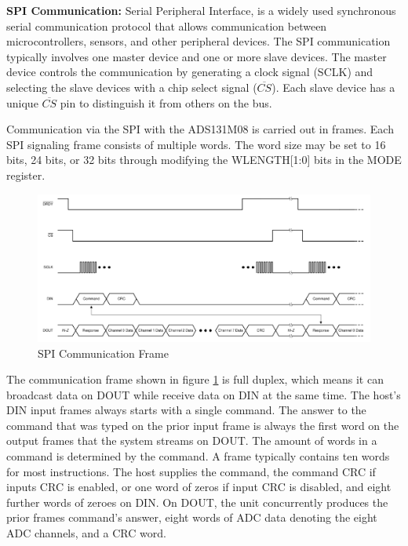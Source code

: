 \textbf{SPI Communication:} Serial Peripheral Interface, is a widely used synchronous serial communication protocol that allows communication between microcontrollers, sensors, and other peripheral devices. The SPI communication typically involves one master device and one or more slave devices. The master device controls the communication by generating a clock signal (SCLK) and selecting the slave devices with a chip select signal ($\overline{CS}$). Each slave device has a unique $\overline{CS}$ pin to distinguish it from others on the bus.  \par
\vspace{1\baselineskip}\par 
Communication via the SPI with the ADS131M08 is carried out in frames. Each SPI signaling frame consists of multiple words. The word size may be set to 16 bits, 24 bits, or 32 bits through modifying the WLENGTH[1:0] bits in the MODE register.
\begin{figure}[htbp]
\centering
\includegraphics[scale=0.6]{images/Communication_Frame.png}
\caption{SPI Communication Frame}
\label{fig:x Communication Frame}
\end{figure}
The communication frame shown in figure \ref{fig:x Communication Frame} is full duplex, which means it can broadcast data on DOUT while receive data on DIN at the same time. The host's DIN input frames always starts with a single command. The answer to the command that was typed on the prior input frame is always the first word on the output frames that the system streams on DOUT. The amount of words in a command is determined by the command. A frame typically contains ten words for most instructions. The host supplies the command, the command CRC if inputs CRC is enabled, or one word of zeros if input CRC is disabled, and eight further words of zeroes on DIN. On DOUT, the unit concurrently produces the prior frames command's answer, eight words of ADC data denoting the eight ADC channels, and a CRC word.


